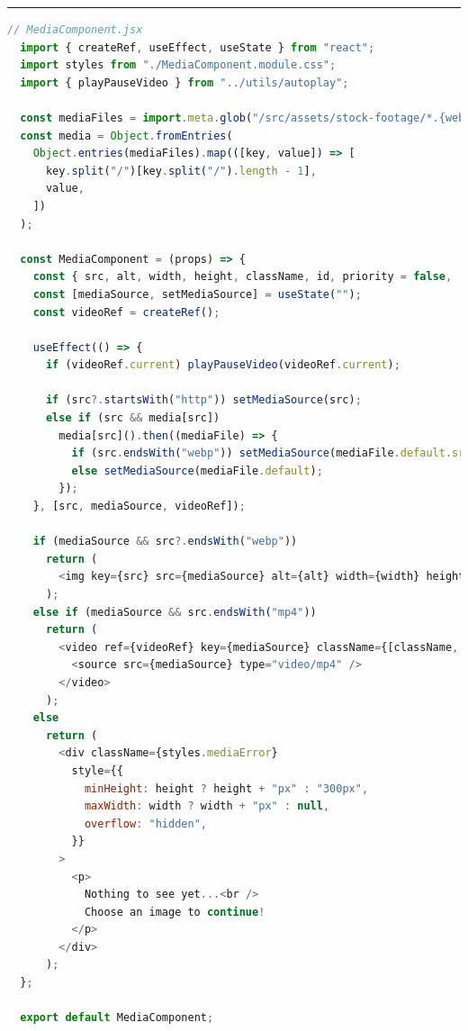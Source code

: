 \documentclass[a4paper, 12pt]{article}
\begin{document}
\vspace{0.5cm} \hrule \vspace{0.5cm}

\begin{lstlisting}[caption=MediaComponent Astro Island with React, label={lst:AstroIsland:MediaComponent}, language=JavaScript]
  // MediaComponent.jsx
  import { createRef, useEffect, useState } from "react";
  import styles from "./MediaComponent.module.css";
  import { playPauseVideo } from "../utils/autoplay";
  
  const mediaFiles = import.meta.glob("/src/assets/stock-footage/*.{webp,mp4}");
  const media = Object.fromEntries(
    Object.entries(mediaFiles).map(([key, value]) => [
      key.split("/")[key.split("/").length - 1],
      value,
    ])
  );
  
  const MediaComponent = (props) => {
    const { src, alt, width, height, className, id, priority = false, ...rest } = props;
    const [mediaSource, setMediaSource] = useState("");
    const videoRef = createRef();
  
    useEffect(() => {
      if (videoRef.current) playPauseVideo(videoRef.current);
  
      if (src?.startsWith("http")) setMediaSource(src);
      else if (src && media[src])
        media[src]().then((mediaFile) => {
          if (src.endsWith("webp")) setMediaSource(mediaFile.default.src);
          else setMediaSource(mediaFile.default);
        });
    }, [src, mediaSource, videoRef]);
  
    if (mediaSource && src?.endsWith("webp"))
      return (
        <img key={src} src={mediaSource} alt={alt} width={width} height={height} className={[className, styles.postMedia].join(" ")} id={id} loading={priority ? "eager" : "lazy"} {...rest} />
      );
    else if (mediaSource && src.endsWith("mp4"))
      return (
        <video ref={videoRef} key={mediaSource} className={[className, styles.postMedia].join(" ")} id={id} width={width} preload="metadata" controls controlsList="nodownload,nofullscreen,noremoteplayback" disablePictureInPicture loop muted >
          <source src={mediaSource} type="video/mp4" />
        </video>
      );
    else
      return (
        <div className={styles.mediaError}
          style={{
            minHeight: height ? height + "px" : "300px",
            maxWidth: width ? width + "px" : null,
            overflow: "hidden",
          }}
        >
          <p>
            Nothing to see yet...<br />
            Choose an image to continue!
          </p>
        </div>
      );
  };
  
  export default MediaComponent;
\end{lstlisting}
\end{document}
